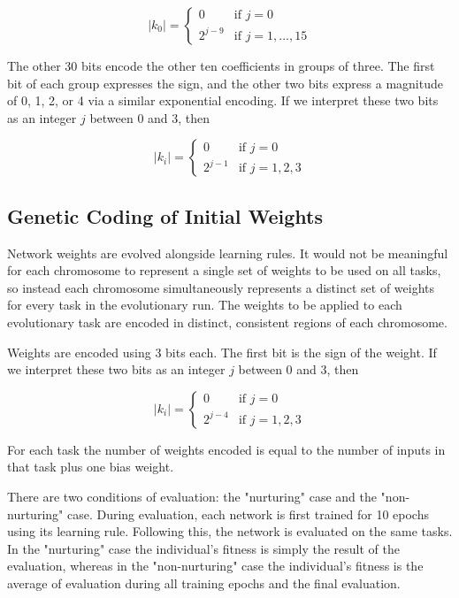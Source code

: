 \documentclass[master]{outhesis}
\begin{document}
\[
	|k_0|=
	\begin{cases}
		0 & \text{if $j = 0$}\\
		2^{j-9} & \text{if $j = 1, ..., 15$}
	\end{cases}
\]

The other 30 bits encode the other ten coefficients in groups of three. The first bit of each group expresses the sign, and the other two bits express a magnitude of 0, 1, 2, or 4 via a similar exponential encoding. If we interpret these two bits as an integer $j$ between 0 and 3, then

\[
	|k_i|=
	\begin{cases}
		0 & \text{if $j = 0$}\\
		2^{j-1} & \text{if $j = 1, 2, 3$}
	\end{cases}
\]

\subsection{Genetic Coding of Initial Weights}

Network weights are evolved alongside learning rules. It would not be meaningful for each chromosome to represent a single set of weights to be used on all tasks, so instead each chromosome simultaneously represents a distinct set of weights for every task in the evolutionary run. The weights to be applied to each evolutionary task are encoded in distinct, consistent regions of each chromosome. 

\newcommand{\bitsperweight}{3}
\newcommand{\jlen}{2}
\newcommand{\jmin}{0}
\newcommand{\jmax}{3}
\newcommand{\exponentshift}{4}

Weights are encoded using 3 bits each. The first bit is the sign of the weight. If we interpret these two bits as an integer $j$ between 0 and 3, then

\[
	|k_i|=
	\begin{cases}
		0 & \text{if $j = 0$}\\
		2^{j-4} & \text{if $j = 1, 2, 3$}
	\end{cases}
\]

For each task the number of weights encoded is equal to the number of inputs in that task plus one bias weight.

There are two conditions of evaluation: the "nurturing" case and the "non-nurturing" case. During evaluation, each network is first trained for 10 epochs using its learning rule. Following this, the network is evaluated on the same tasks. In the "nurturing" case the individual's fitness is simply the result of the evaluation, whereas in the "non-nurturing" case the individual's fitness is the average of evaluation during all training epochs and the final evaluation.
\end{document}

